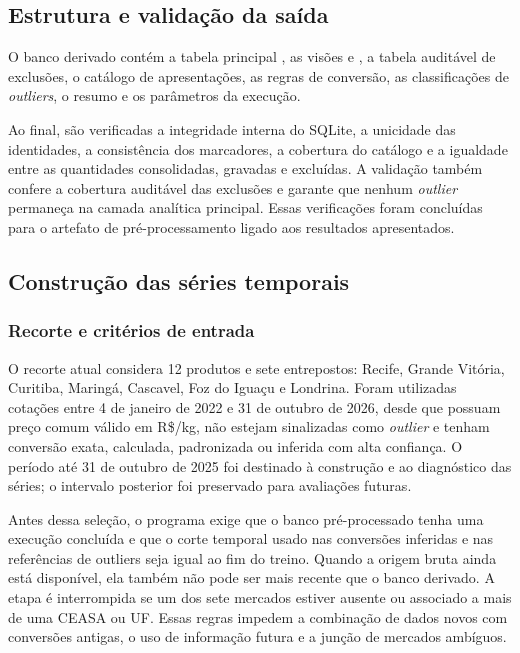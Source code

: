 \documentclass[12pt,a4paper]{article}
\begin{document}
\subsection{Estrutura e validação da saída}

O banco derivado contém a tabela principal
, as visões  e
, a tabela auditável de exclusões, o
catálogo de apresentações, as regras de conversão, as classificações de
\textit{outliers}, o resumo e os parâmetros da execução.

Ao final, são verificadas a integridade interna do SQLite, a unicidade das
identidades, a consistência dos marcadores, a cobertura do catálogo e a
igualdade entre as quantidades consolidadas, gravadas e excluídas. A validação
também confere a cobertura auditável das exclusões e garante que nenhum
\textit{outlier} permaneça na camada analítica principal. Essas verificações
foram concluídas para o artefato de pré-processamento ligado aos resultados
apresentados.


\subsection{Construção das séries temporais}

\subsubsection{Recorte e critérios de entrada}

O recorte atual considera 12 produtos e sete entrepostos: Recife, Grande
Vitória, Curitiba, Maringá, Cascavel, Foz do Iguaçu e Londrina. Foram utilizadas
cotações entre 4 de janeiro de 2022 e 31 de outubro de 2026, desde que possuam
preço comum válido em R\$/kg, não estejam sinalizadas como \textit{outlier} e
tenham conversão exata, calculada, padronizada ou inferida com alta confiança.
O período até 31 de outubro de 2025 foi destinado à construção e ao diagnóstico
das séries; o intervalo posterior foi preservado para avaliações futuras.

Antes dessa seleção, o programa exige que o banco pré-processado tenha uma
execução concluída e que o corte temporal usado nas conversões inferidas e nas
referências de outliers seja igual ao fim do treino. Quando a origem bruta ainda
está disponível, ela também não
pode ser mais recente que o banco derivado. A etapa é interrompida se um dos
sete mercados estiver ausente ou associado a mais de uma CEASA ou UF. Essas
regras impedem a combinação de dados novos com conversões antigas, o uso de
informação futura e a junção de mercados ambíguos.
\end{document}
